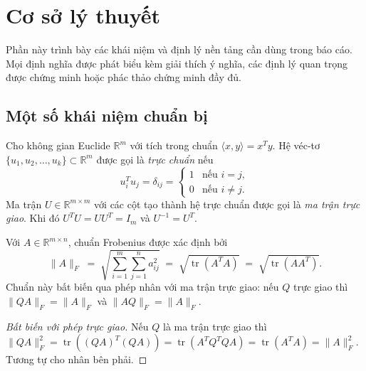 \section{Cơ sở lý thuyết}\label{sec:theory}

Phần này trình bày các khái niệm và định lý nền tảng cần dùng trong báo cáo.
Mọi định nghĩa được phát biểu kèm giải thích ý nghĩa, các định lý quan trọng
được chứng minh hoặc phác thảo chứng minh đầy đủ.

\subsection{Một số khái niệm chuẩn bị}\label{subsec:prelim}

\begin{definition}\label{def:orthonormal}
Cho không gian Euclide $\mathbb{R}^m$ với tích trong chuẩn
$\langle x, y\rangle = x^T y$. Hệ véc-tơ
$\{u_1, u_2, \dots, u_k\} \subset \mathbb{R}^m$ được gọi là \emph{trực chuẩn}
nếu
\[
    u_i^T u_j = \delta_{ij} =
    \begin{cases} 1 & \text{nếu } i = j,\\ 0 & \text{nếu } i \neq j.\end{cases}
\]
Ma trận $U \in \mathbb{R}^{m\times m}$ với các cột tạo thành hệ trực chuẩn
được gọi là \emph{ma trận trực giao}. Khi đó $U^T U = U U^T = I_m$ và
$U^{-1} = U^T$.
\end{definition}

\begin{definition}\label{def:frobenius}
Với $A \in \mathbb{R}^{m\times n}$, chuẩn Frobenius được xác định bởi
\[
    \|A\|_F \;=\; \sqrt{\sum_{i=1}^{m}\sum_{j=1}^{n} a_{ij}^2}
            \;=\; \sqrt{\operatorname{tr}(A^T A)}
            \;=\; \sqrt{\operatorname{tr}(A A^T)}.
\]
Chuẩn này bất biến qua phép nhân với ma trận trực giao: nếu $Q$ trực giao thì
$\|Q A\|_F = \|A\|_F$ và $\|A Q\|_F = \|A\|_F$.
\end{definition}

\begin{proof}[Bất biến với phép trực giao]
Nếu $Q$ là ma trận trực giao thì
$\|Q A\|_F^2 = \operatorname{tr}((QA)^T (QA))
= \operatorname{tr}(A^T Q^T Q A) = \operatorname{tr}(A^T A) = \|A\|_F^2.$
Tương tự cho nhân bên phải.
\end{proof}

